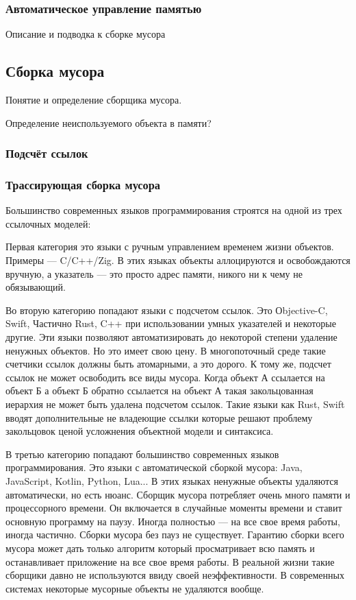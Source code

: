 \subsubsection{Автоматическое управление памятью}

Описание и подводка к сборке мусора



\subsection{Сборка мусора}

Понятие и определение сборщика мусора.

Определение неиспользуемого объекта в памяти?

\subsubsection{Подсчёт ссылок}



\subsubsection{Трассирующая сборка мусора}



Большинство современных языков программирования строятся на одной из трех ссылочных моделей:

Первая категория это языки с ручным управлением временем жизни объектов. Примеры — C/C++/Zig. В этих языках объекты аллоцируются и освобождаются вручную, а указатель — это просто адрес памяти, никого ни к чему не обязывающий.

Во вторую категорию попадают языки с подсчетом ссылок. Это Оbjective-C, Swift, Частично Rust, C++ при использовании умных указателей и некоторые другие. Эти языки позволяют автоматизировать до некоторой степени удаление ненужных объектов. Но это имеет свою цену. В многопоточный среде такие счетчики ссылок должны быть атомарными, а это дорого. К тому же, подсчет ссылок не может освободить все виды мусора. Когда объект А ссылается на объект Б а объект Б обратно ссылается на объект А такая закольцованная иерархия не может быть удалена подсчетом ссылок. Такие языки как Rust, Swift вводят дополнительные не владеющие ссылки которые решают проблему закольцовок ценой усложнения объектной модели и синтаксиса.

В третью категорию попадают большинство современных языков программирования. Это языки с автоматической сборкой мусора: Java, JavaScript, Kotlin, Python, Lua... В этих языках ненужные объекты удаляются автоматически, но есть нюанс. Сборщик мусора потребляет очень много памяти и процессорного времени. Он включается в случайные моменты времени и ставит основную программу на паузу. Иногда полностью — на все свое время работы, иногда частично. Сборки мусора без пауз не существует. Гарантию сборки всего мусора может дать только алгоритм который просматривает всю память и останавливает приложение на все свое время работы. В реальной жизни такие сборщики давно не используются ввиду своей неэффективности. В современных системах некоторые мусорные объекты не удаляются вообще.

